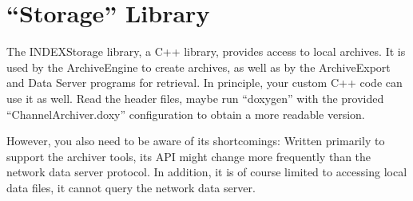 \section{``Storage'' Library} \label{sec:javaclient}
The INDEX{Storage library}, a C++ library, provides access to
local archives. It is used by the ArchiveEngine to create archives,
as well as by the ArchiveExport and Data Server programs for
retrieval.
In principle, your custom C++ code can use it as well.
Read the header files, maybe run ``doxygen'' with the provided
``ChannelArchiver.doxy'' configuration to obtain a more readable
version.

However, you also need to be aware of its shortcomings: Written
primarily to support the archiver tools, its API might change more
frequently than the network data server protocol. In addition, it is
of course limited to accessing local data files, it cannot query the
network data server.
